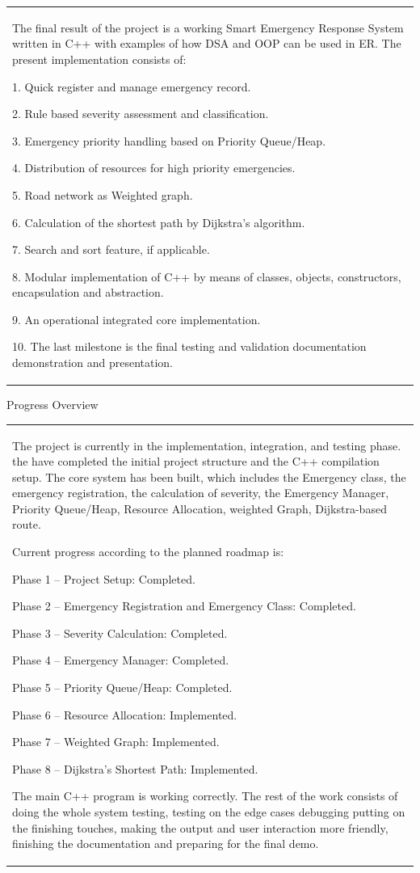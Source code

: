 \documentclass[12pt,a4paper]{article}
\newcommand{\sectiontitle}[1]{%
    {\color{GEUBlue}
    \fontsize{18}{22}\selectfont #1}
}
\newcommand{\instruction}[1]{%
    {\color{InstructionGrey}
    \fontsize{10.5}{13}\selectfont #1}
}
\newcommand{\answerbox}[2]{%
    \begin{tabularx}{\textwidth}{
        |>{\raggedright\arraybackslash}X|}
        \hline
        \parbox[t][#1][t]{\dimexpr\linewidth-12pt\relax}{
            \vspace{5pt}
            \fontsize{11}{13}\selectfont #2
        }\\
        \hline
    \end{tabularx}
}
\begin{document}
\answerbox{6.00cm}{The final result of the project is a working Smart Emergency Response System written in C++ with examples of how DSA and OOP can be used in ER.
The present implementation consists of:

1. Quick register and manage emergency record.

2. Rule based severity assessment and classification.

3. Emergency priority handling based on Priority Queue/Heap.

4. Distribution of resources for high priority emergencies.

5. Road network as Weighted graph.

6. Calculation of the shortest path by Dijkstra's algorithm.

7. Search and sort feature, if applicable.

8. Modular implementation of C++ by means of classes, objects, constructors, encapsulation and abstraction.

9. An operational integrated core implementation.

10. The last milestone is the final testing and validation documentation demonstration and presentation.
}

\vspace{1.55cm}
\newpage
\sectiontitle{Progress Overview}

\vspace{0.05cm}

\instruction{}

\vspace{0.20cm}

\answerbox{7.80cm}{The project is currently in the implementation, integration, and testing phase. the have completed the initial project structure and the C++ compilation setup. The core system has been built, which includes the Emergency class, the emergency registration, the calculation of severity, the Emergency Manager, Priority Queue/Heap, Resource Allocation, weighted Graph, Dijkstra-based route.

Current progress according to the planned roadmap is:

Phase 1 -- Project Setup: Completed.

Phase 2 -- Emergency Registration and Emergency Class: Completed.

Phase 3 -- Severity Calculation: Completed.

Phase 4 -- Emergency Manager: Completed.

Phase 5 -- Priority Queue/Heap: Completed.

Phase 6 -- Resource Allocation: Implemented.

Phase 7 -- Weighted Graph: Implemented.

Phase 8 -- Dijkstra's Shortest Path: Implemented.

The main C++ program is working correctly. The rest of the work consists of doing the whole system testing, testing on the edge cases debugging putting on the finishing touches, making the output and user interaction more friendly, finishing the documentation and preparing for the final demo.
}
\end{document}
